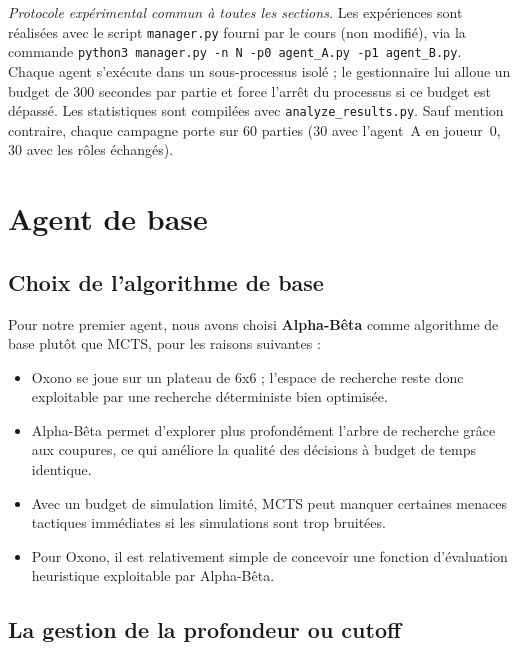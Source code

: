 \textit{Protocole expérimental commun à toutes les sections.} Les expériences sont réalisées avec le script \texttt{manager.py} fourni par le cours (non modifié), via la commande \texttt{python3 manager.py -n N -p0 agent\_A.py -p1 agent\_B.py}. Chaque agent s'exécute dans un sous-processus isolé ; le gestionnaire lui alloue un budget de 300 secondes par partie et force l'arrêt du processus si ce budget est dépassé. Les statistiques sont compilées avec \texttt{analyze\_results.py}. Sauf mention contraire, chaque campagne porte sur 60 parties (30 avec l'agent~A en joueur~0, 30 avec les rôles échangés).

\bigskip
\section{Agent de base}

\subsection{Choix de l'algorithme de base}

Pour notre premier agent, nous avons choisi \textbf{Alpha-Bêta} comme algorithme de base plutôt que MCTS, pour les raisons suivantes :\\

\begin{itemize}
    \item Oxono se joue sur un plateau de 6x6 ; l'espace de recherche reste donc exploitable par une recherche déterministe bien optimisée.
    
    \item Alpha-Bêta permet d'explorer plus profondément l'arbre de recherche grâce aux coupures, ce qui améliore la qualité des décisions à budget de temps identique.
    
    \item Avec un budget de simulation limité, MCTS peut manquer certaines menaces tactiques immédiates si les simulations sont trop bruitées.
    
    \item Pour Oxono, il est relativement simple de concevoir une fonction d'évaluation heuristique exploitable par Alpha-Bêta.
\end{itemize}


\subsection{La gestion de la profondeur ou cutoff}

